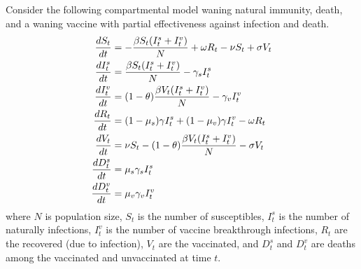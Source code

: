 \documentclass[11pt]{article}
\begin{document}








Consider the following compartmental model waning natural immunity, death, and a waning vaccine with partial effectiveness against infection and death.
\begin{align}
    \begin{split}\label{eqn:sirv}
    \frac{d{S_t}}{d{t}} &=  - \frac{\beta S_t (I^s_t + I^v_t)}{N} + \omega R_t - \nu S_t + \sigma V_t \\
    \frac{d{I^s_t}}{d{t}} &=  \frac{\beta S_t (I^s_t + I^v_t)}{N} - \gamma_s I^s_t \\
    \frac{d{I^v_t}}{d{t}} &=  (1 - \theta) \frac{\beta V_t (I^s_t + I^v_t)}{N} - \gamma_v I^v_t  \\
    \frac{d{R_t}}{d{t}} &=  (1 - \mu_s) \gamma I^s_t +(1 - \mu_v) \gamma I^v_t - \omega R_t \\
    \frac{d{V_t}}{d{t}} &=  \nu S_t - (1 - \theta) \frac{\beta V_t (I^s_t + I^v_t)}{N}  - \sigma V_t \\
    \frac{d{D^s_t}}{d{t}} &=  \mu_s \gamma_s I^s_t \\
    \frac{d{D^v_t}}{d{t}} &=  \mu_v \gamma_v I^v_t
    \end{split}
\end{align}
where $N$ is population size, $S_t$ is the number of susceptibles, $I^s_t$ is the number of naturally infections, $I^v_t$ is the number of vaccine breakthrough infections, $R_t$ are the recovered (due to infection), $V_t$ are the vaccinated, and $D^s_t$ and $D^v_t$ are deaths among the vaccinated and unvaccinated at time $t$. 
\end{document}

